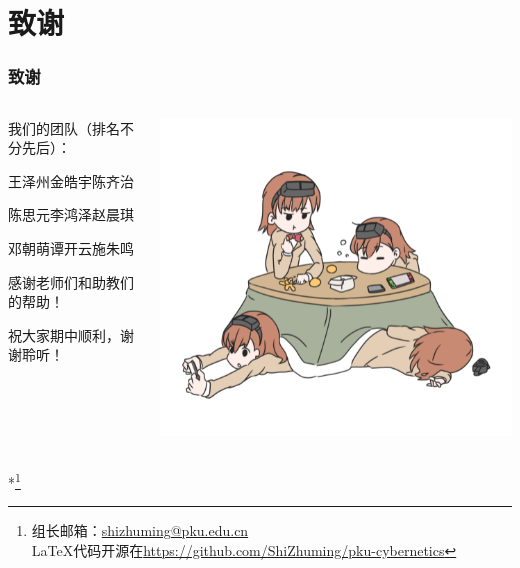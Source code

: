 \documentclass[12pt,AutoFakeBold,aspectratio=43,mathserif]{beamer}
\begin{document}
    \section*{致谢}

    \begin{frame}
        \frametitle{致谢}
        \begin{columns}
            \begin{column}{.5\linewidth}
                我们的团队（排名不分先后）：

                王泽州\quad 金皓宇\quad 陈齐治
        
                陈思元\quad 李鸿泽\quad 赵晨琪
                
                邓朝萌\quad 谭开云\quad 施朱鸣
            
                \bigskip

                感谢老师们和助教们的帮助！

                祝大家期中顺利，谢谢聆听！
            \end{column}
            \begin{column}{.5\linewidth}
                \includegraphics[width=.4\paperwidth]{figures/misaka558.png}
            \end{column}
        \end{columns}
        *\footnote{组长邮箱：\href{mailto:shizhuming@pku.edu.cn}{shizhuming@pku.edu.cn} \\ LaTeX代码开源在\url{https://github.com/ShiZhuming/pku-cybernetics}}
    \end{frame}
    
\end{document}
